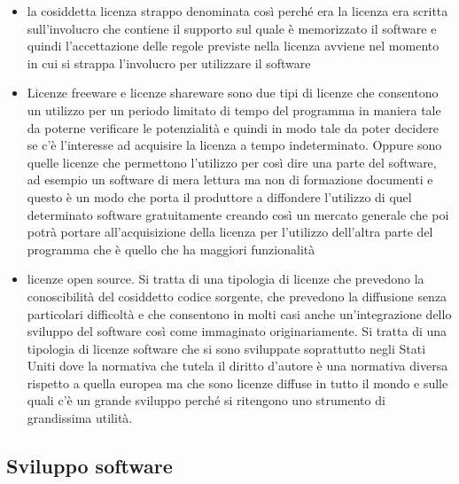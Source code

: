 \begin{itemize}
    \item la cosiddetta licenza strappo denominata così perché era la licenza era scritta sull'involucro che contiene il supporto sul quale è memorizzato il software e quindi l'accettazione delle regole previste nella licenza avviene nel momento in cui si strappa l'involucro per utilizzare il software
    \item Licenze freeware e licenze shareware sono due tipi di licenze che consentono un utilizzo per un periodo limitato di tempo del programma in maniera tale da poterne verificare le potenzialità e quindi in modo tale da poter decidere se c'è l'interesse ad acquisire la licenza a tempo indeterminato. Oppure sono quelle licenze che permettono l'utilizzo per così dire una parte del software, ad esempio un software di mera lettura ma non di formazione documenti e questo è un modo che porta il produttore a diffondere l'utilizzo di quel determinato software gratuitamente creando così un mercato generale che poi potrà portare all'acquisizione della licenza per l'utilizzo dell'altra parte del programma che è quello che ha maggiori funzionalità
    \item licenze open source. Si tratta di una tipologia di licenze che prevedono la conoscibilità del cosiddetto codice sorgente, che prevedono la diffusione senza particolari difficoltà e che consentono in molti casi anche un'integrazione dello sviluppo del software così come immaginato originariamente. Si tratta di una tipologia di licenze software che si sono sviluppate soprattutto negli Stati Uniti dove la normativa che tutela il diritto d'autore è una normativa diversa rispetto a quella europea ma che sono licenze diffuse in tutto il mondo e sulle quali c'è un grande sviluppo perché si ritengono uno strumento di grandissima utilità. 
\end{itemize}

\subsection{Sviluppo software}

